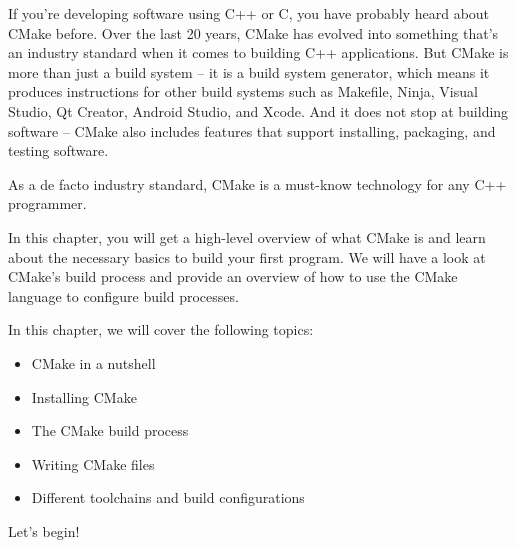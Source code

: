 If you're developing software using C++ or C, you have probably heard about CMake before. Over the last 20 years, CMake has evolved into something that's an industry standard when it comes to building C++ applications. But CMake is more than just a build system – it is a build system generator, which means it produces instructions for other build systems such as Makefile, Ninja, Visual Studio, Qt Creator, Android Studio, and Xcode. And it does not stop at building software – CMake also includes features that support installing, packaging, and testing software.

As a de facto industry standard, CMake is a must-know technology for any C++ programmer.

In this chapter, you will get a high-level overview of what CMake is and learn about the necessary basics to build your first program. We will have a look at CMake's build process and provide an overview of how to use the CMake language to configure build processes.

In this chapter, we will cover the following topics:

\begin{itemize}
\item CMake in a nutshell
\item Installing CMake
\item The CMake build process
\item Writing CMake files
\item Different toolchains and build configurations
\end{itemize}

Let's begin!